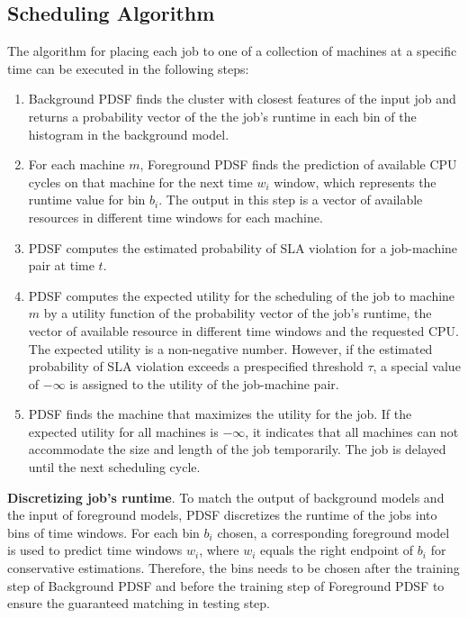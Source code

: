 \documentclass[sigplan,10pt,review,anonymous]{acmart}
\begin{document}
\subsection{Scheduling Algorithm}
\label{sec:section5.1}

The algorithm for placing each job to one of a collection of machines at a specific time can be executed in the following steps:

\begin{enumerate}[Step 1]
    \item Background PDSF finds the cluster with closest features of the input job and returns a probability vector of the the job's runtime in each bin of the histogram in the background model.
    \item For each machine $m$, Foreground PDSF finds the prediction of available CPU cycles on that machine for the next time $w_i$ window, which represents the runtime value for bin $b_i$. The output in this step is a vector of available resources in different time windows for each machine.
    \item PDSF computes the estimated probability of SLA violation for a job-machine pair at time $t$.
    \item PDSF computes the expected utility for the scheduling of the job to machine $m$ by a utility function of the probability vector of the job's runtime, the vector of available resource in different time windows and the requested CPU. The expected utility is a non-negative number. However, if the estimated probability of SLA violation exceeds a prespecified threshold $\tau$, a special value of $-\infty$ is assigned to the utility of the job-machine pair.
    \item PDSF finds the machine that maximizes the utility for the job. If the expected utility for all machines is $-\infty$, it indicates that all machines can not accommodate the size and length of the job temporarily. The job is delayed until the next scheduling cycle.
\end{enumerate}

\textbf{Discretizing job's runtime}. To match the output of background models and the input of foreground models, PDSF discretizes the runtime of the jobs into bins of time windows. For each bin $b_i$ chosen, a corresponding foreground model is used to predict time windows $w_i$, where $w_i$ equals the right endpoint of $b_i$ for conservative estimations. Therefore, the bins needs to be chosen after the training step of Background PDSF and before the training step of Foreground PDSF to ensure the guaranteed matching in testing step.
\end{document}
